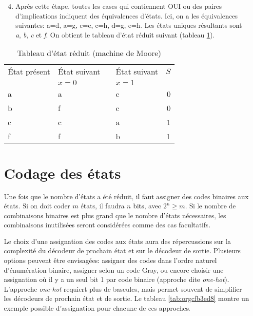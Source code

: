 \documentclass[letter, oneside]{book}
\begin{document}
\begin{enumerate}
\begin{enumerate}
\setcounter{enumi}{3}
\item Après cette étape, toutes les  cases qui contiennent OUI ou des
paires d'implications indiquent des équivalences d'états. Ici, on a
les équivalences suivantes: a=d, a=g, c=e, c=h, d=g, e=h. Les états
uniques résultants sont \emph{a}, \emph{b}, \emph{c} et \emph{f}. On obtient le tableau
d'état réduit suivant (tableau \ref{tab:orga349cfc}).
\end{enumerate}

\begin{table}[htbp]
\caption{\label{tab:orga349cfc}Tableau d'état réduit (machine de Moore)}
\centering
\begin{tabular}{llllr}
État présent & État suivant &  & État suivant & \(S\)\\[0pt]
 & \(x=0\) &  & \(x=1\) & \\[0pt]
\hline
a & a &  & c & 0\\[0pt]
b & f &  & c & 0\\[0pt]
c & c &  & a & 1\\[0pt]
f & f &  & b & 1\\[0pt]
\end{tabular}
\end{table}
\end{enumerate}


\section{Codage des états}
\label{sec:orge902d4b}

Une fois que le nombre d'états a été réduit, il faut assigner des
codes binaires aux états. Si on doit coder \(m\) états, il faudra
\(n\) bits, avec \(2^n \geq m\). Si le nombre de combinaisons
binaires est plus grand que le nombre d'états nécessaires, les
combinaisons inutilisées seront considérées comme des cas facultatifs.

Le choix d'une assignation des codes aux états aura des répercussions
sur la complexité du décodeur de prochain état et sur le décodeur de
sortie. Plusieurs options peuvent être envisagées: assigner des codes
dans l'ordre naturel d'énumération binaire, assigner selon un code
Gray, ou encore choisir une assignation où il y a un seul bit 1 par
code binaire (approche dite \emph{one-hot}). L'approche \emph{one-hot} requiert
plus de bascules, mais permet souvent de simplifier les décodeurs de
prochain état et de sortie. Le tableau \ref{tab:orgcfb3ed8} montre
un exemple possible d'assignation pour chacune de ces approches.
\end{document}
